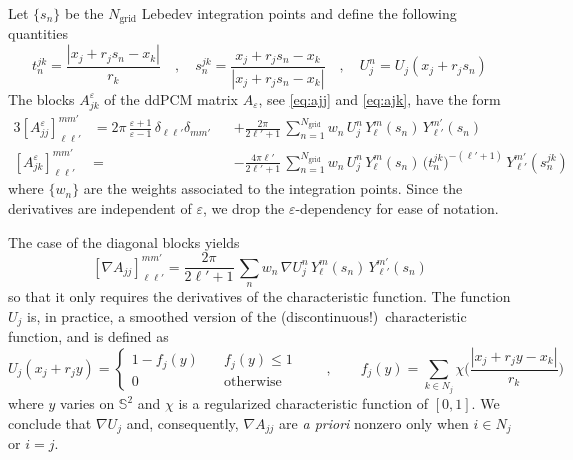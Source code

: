 Let $\{ s_n\}$ be the $N_\text{grid}$ Lebedev integration points and define the following quantities
\[
t_n^{jk} = \frac{|x_j + r_j s_n -x_k|}{r_k} \quad , \quad s_n^{jk} = \frac{x_j + r_j s_n -x_k}{|x_j + r_j s_n -x_k|}\quad , \quad U_j^n = U_j(x_j + r_j s_n)
\]
The blocks $A_{jk}^\varepsilon$ of the ddPCM matrix $A_\varepsilon$, see \eqref{eq:ajj} and \eqref{eq:ajk}, have the form
\begin{alignat*}{3}
{[A_{jj}^\varepsilon]}_{\ell \ell'}^{mm'}& = 2\pi \, \frac{\varepsilon + 1}{\varepsilon - 1}\, \delta_{\ell \ell'} \delta_{m m'}&& + \frac{2\pi}{2 \ell' + 1} \,\sum_{n= 1}^{N_\text{grid}} w_n \, U_j^n  \,Y_\ell^m(s_n) \,  Y_{\ell'}^{m'}(s_n) \\
{[A_{jk}^\varepsilon]}_{\ell \ell'}^{mm'}& =&& -  \frac{4 \pi \ell'}{2 \ell'+1} \, \sum_{n= 1}^{N_\text{grid}} w_n\, U_j^n  \, Y_\ell^m(s_n) \, \big( t_n^{jk}\big)^{-(\ell'+1)} \, Y_{\ell'}^{m'} (s_n^{jk})
\end{alignat*}
where $\{ w_n\}$ are the weights associated to the integration points. Since the derivatives are independent of $\varepsilon$, we drop the $\varepsilon$-dependency for ease of notation.

The case of the diagonal blocks yields
\[
{[\nabla A_{jj}]}_{\ell \ell'}^{mm'} = \frac{2\pi}{2 \ell' + 1} \,\sum_{n} w_n \, \nabla U_j^n  \,Y_\ell^m(s_n) \,  Y_{\ell'}^{m'}(s_n)
\]
so that it only requires the derivatives of the characteristic function. The function $U_j$ is, in practice, a smoothed version of the (discontinuous!)~characteristic function, and is defined as 
\[
U_j(x_j + r_j y) =
\begin{cases}
1 - f_j(y) 	&\quad f_j(y) \le 1\\
0		&\quad \text{otherwise}
\end{cases}
\qquad , \qquad 
f_j(y) = \sum_{k \in N_j} \chi \bigg(\frac{|x_j + r_j y - x_k|}{r_k}\bigg)
\]
where $y$ varies on $\mathbb{S}^2$ and $\chi$ is a regularized characteristic function of $[0,1]$. We conclude that $\nabla U_j$ and, consequently, $\nabla A_{jj}$ are \emph{a priori} nonzero only when $i \in N_j$ or $i = j$.

